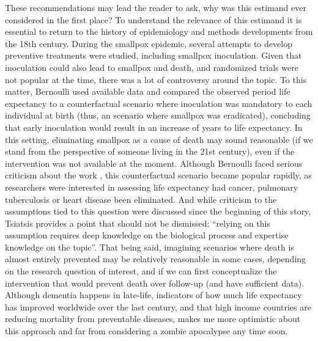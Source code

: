\documentclass[
]{book}
\begin{document}
These recommendations may lead the reader to ask, why was this estimand ever considered in the first place? To understand the relevance of this estimand it is essential to return to the history of epidemiology and methods developments from the 18th century. During the smallpox epidemic, several attempts to develop preventive treatments were studied, including smallpox inoculation. Given that inoculation could also lead to smallpox and death, and randomized trials were not popular at the time, there was a lot of controversy around the topic\autocite{karn1932}. To this matter, Bernoulli used available data and compared the observed period life expectancy to a counterfactual scenario where inoculation was mandatory to each individual at birth (thus, an scenario where smallpox was eradicated), concluding that early inoculation would result in an increase of years to life expectancy\autocite{karn1932,colombo2015}. In this setting, eliminating smallpox as a cause of death may sound reasonable (if we stand from the perspective of someone living in the 21st century), even if the intervention was not available at the moment. Although Bernoulli faced serious criticism about the work \autocite[\textcite{colombo2015}]{seth2014}, this counterfactual scenario became popular rapidly, as researchers were interested in assessing life expectancy had cancer, pulmonary tuberculosis or heart disease been eliminated\autocite{karn1933}. And while criticism to the assumptions tied to this question were discussed since the beginning of this story, Tsiatsis provides a point that should not be dismissed: ``relying on this assumption requires deep knowledge on the biological process and expertise knowledge on the topic''\autocite{tsiatis1975}. That being said, imagining scenarios where death is almost entirely prevented may be relatively reasonable in some cases, depending on the research question of interest, and if we can first conceptualize the intervention that would prevent death over follow-up (and have sufficient data). Although dementia happens in late-life, indicators of how much life expectancy has improved worldwide over the last century, and that high income countries are reducing mortality from preventable diseases, makes me more optimistic about this approach and far from considering a zombie apocalypse any time soon.
\end{document}
